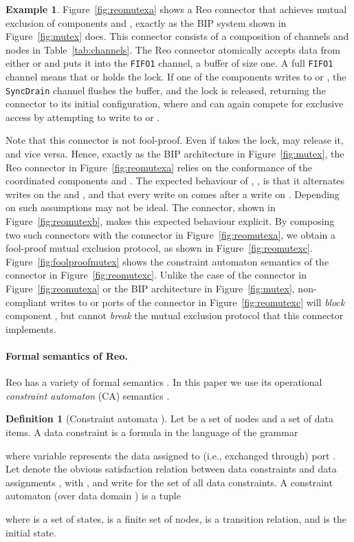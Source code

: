 \documentclass[submission,copyright,creativecommons,hidelinks]{eptcs}
\theoremstyle{plain} \newtheorem{theorem}{Theorem}
\theoremstyle{definition}
\newtheorem{definition}{Definition}
\newtheorem{example}{Example}
\theoremstyle{remark}
\newcommand\xqed[1]{\leavevmode\unskip\penalty9999 \hbox{}\nobreak\hfill
  \quad\hbox{#1}}
\newcommand\tri{\xqed{}}
\newcommand{\fig}[2][]{Figure~\ref{fig:#2}\ensuremath{#1}}
\newcommand{\tab}[1]{Table~\ref{tab:#1}}
\begin{document}
\begin{example}
\label{ex:reomutex}
\fig{reomutexa} shows a Reo connector that achieves mutual exclusion of components  and , exactly as the BIP system shown in \fig{mutex} does. This connector consists of a composition of channels and nodes in \tab{channels}. The Reo connector atomically accepts data from either  or  and puts it into the {\tt FIFO1} channel, a buffer of size one.
A full {\tt FIFO1} channel means that  or  holds the lock. 
If one of the components writes to  or , the {\tt SyncDrain} channel flushes the buffer, and the lock is released, returning the connector to its initial configuration, where  and  can again compete for exclusive access by attempting to write to  or .

Note that this connector is not fool-proof. Even if  takes the lock,  may release it, and vice versa. 
Hence, exactly as the BIP architecture in \fig{mutex}, the Reo connector in \fig{reomutexa} relies on the conformance of the coordinated components  and . 
The expected behaviour of , , is that it alternates writes on the  and , and that every write on  comes after a write on .
Depending on such assumptions may not be ideal.
The connector, shown in \fig{reomutexb}, makes this expected behaviour explicit. 
By composing two such connectors with the connector in \fig{reomutexa}, we obtain a fool-proof mutual exclusion protocol, as shown in \fig{reomutexc}. 
\fig{foolproofmutex} shows the constraint automaton semantics of the connector in \fig{reomutexc}.
Unlike the case of the connector in \fig{reomutexa} or the BIP architecture in \fig{mutex}, non-compliant writes to  or  ports of the connector in \fig{reomutexc} will {\em block} component , but cannot {\em break} the mutual exclusion protocol that this connector implements.
\tri
\end{example}

\paragraph{Formal semantics of Reo.} 
Reo has a variety of formal semantics \cite{Arbab11, JA12}. In this paper we use its operational \emph{constraint automaton} (CA) semantics \cite{BSAR06}.

\begin{definition}[Constraint automata \cite{BSAR06}] 
\label{defn:CA} 
Let  be a set of nodes and  a set of data items. A data constraint is a formula in the language of the grammar

where variable  represents the data assigned to (i.e., exchanged through) port .
Let  denote the obvious satisfaction relation between data constraints and data assignments , with , and write  for the set of all data constraints.
A constraint automaton (over data domain ) is a tuple

where  is a set of states,  is a finite set of nodes,  is a transition relation, and   is the initial state.
\end{definition}
\end{document}
